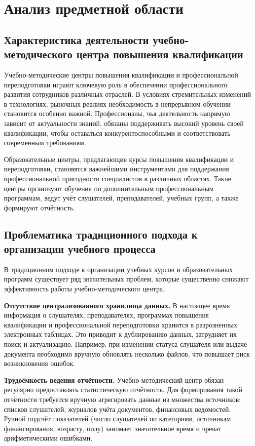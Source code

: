 \section{Анализ предметной области}

\subsection{Характеристика деятельности учебно-методического центра повышения квалификации}

Учебно-методические центры повышения квалификации и профессиональной переподготовки играют ключевую роль в обеспечении профессионального развития сотрудников различных отраслей. В условиях стремительных изменений в технологиях, рыночных реалиях необходимость в непрерывном обучении становится особенно важной. Профессионалы, чья деятельность напрямую зависит от актуальности знаний, обязаны поддерживать высокий уровень своей квалификации, чтобы оставаться конкурентоспособными и соответствовать современным требованиям.

Образовательные центры, предлагающие курсы повышения квалификации и переподготовки, становятся важнейшими инструментами для поддержания профессиональной пригодности специалистов в различных областях. Такие центры организуют обучение по дополнительным профессиональным программам, ведут учёт слушателей, преподавателей, учебных групп, а также формируют отчётность.

\subsection{Проблематика традиционного подхода к организации учебного процесса}

В традиционном подходе к организации учебных курсов и образовательных программ существует ряд значительных проблем, которые существенно снижают эффективность работы учебно-методического центра.

\textbf{Отсутствие централизованного хранилища данных.} В настоящее время информация о слушателях, преподавателях, программах повышения квалификации и профессиональной переподготовки хранится в разрозненных электронных таблицах. Это приводит к дублированию данных, затрудняет их поиск и актуализацию. Например, при изменении статуса слушателя или выдаче документа необходимо вручную обновлять несколько файлов, что повышает риск возникновения ошибок.

\textbf{Трудоёмкость ведения отчётности.} Учебно-методический центр обязан регулярно предоставлять статистическую отчётность. Для формирования такой отчётности требуется вручную агрегировать данные из множества источников: списков слушателей, журналов учёта документов, финансовых ведомостей. Ручной подсчёт показателей (число слушателей по категориям, источникам финансирования, возрасту, полу) занимает значительное время и чреват арифметическими ошибками.

